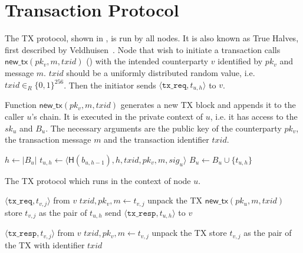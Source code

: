 \section{Transaction Protocol}
\label{sec:tx-protocol}

The TX protocol, shown in , is run by all nodes.
It is also known as True Halves, first described by Veldhuisen~\cite[Chapter~3.2]{truehalves}.
Node that wish to initiate a transaction calls $\textsf{new\_tx}(pk_v, m, txid)$ () with the intended counterparty $v$ identified by $pk_v$ and message $m$.
$txid$ should be a uniformly distributed random value, i.e. $txid \in_R \{0, 1\}^{256}$.
Then the initiator sends $\langle \texttt{tx\_req}, t_{u, h}\rangle$ to $v$.

\begin{algorithm}
    \caption{Function $\textsf{new\_tx}(pk_v, m, txid)$ generates a new TX block and appends it to the caller $u$'s chain.
    It is executed in the private context of $u$, i.e. it has access to the $sk_u$ and $B_u$.
    The necessary arguments are the public key of the counterparty $pk_v$, the transaction message $m$ and the transaction identifier $txid$.}
    \label{alg:new-tx}

    \begin{algorithmic}
    \State $h \gets |B_u|$
    \State $t_{u, h} \gets \langle \textsf{H}(b_{u, h - 1}), h, txid, pk_v, m, sig_u \rangle$
    \State $B_u \gets B_u \cup \{ t_{u, h} \}$
    \end{algorithmic}
\end{algorithm}

\begin{algorithm}
    \caption{The TX protocol which runs in the context of node $u$.}
    \label{alg:tx-proto}

    \begin{algorithmic}
        \Upon $\langle \texttt{tx\_req}, t_{v, j} \rangle$ from $v$
        \State $txid, pk_v, m \gets t_{v, j}$ \Comment unpack the TX
        \State $\textsf{new\_tx}(pk_u, m, txid)$
        \State store $t_{v, j}$ as the pair of $t_{u, h}$
        \State send $\langle \texttt{tx\_resp}, t_{u, h} \rangle$ to $v$

        \Upon $\langle \texttt{tx\_resp}, t_{v, j} \rangle$ from $v$
        \State $txid, pk_v, m \gets t_{v, j}$ \Comment unpack the TX
        \State store $t_{v, j}$ as the pair of the TX with identifier $txid$
    \end{algorithmic}
\end{algorithm}

